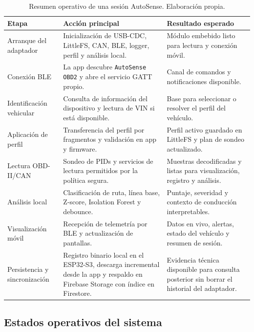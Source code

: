 \documentclass[12pt,letterpaper]{report}
\begin{document}
\begin{table}[htbp]
\centering
\small
\caption{Resumen operativo de una sesión AutoSense. Elaboración propia.}
\label{tab:autosense-general-operation}
\begin{tabular}{p{}p{}p{}}
\toprule
\textbf{Etapa} & \textbf{Acción principal} & \textbf{Resultado esperado} \\
\midrule
Arranque del adaptador & Inicialización de USB-CDC, LittleFS, CAN, BLE, logger, perfil y análisis local. & Módulo embebido listo para lectura y conexión móvil. \\
\addlinespace
Conexión BLE & La app descubre \texttt{AutoSense OBD2} y abre el servicio GATT propio. & Canal de comandos y notificaciones disponible. \\
\addlinespace
Identificación vehicular & Consulta de información del dispositivo y lectura de VIN si está disponible. & Base para seleccionar o resolver el perfil del vehículo. \\
\addlinespace
Aplicación de perfil & Transferencia del perfil por fragmentos y validación en app y firmware. & Perfil activo guardado en LittleFS y plan de sondeo actualizado. \\
\addlinespace
Lectura OBD-II/CAN & Sondeo de PIDs y servicios de lectura permitidos por la política segura. & Muestras decodificadas y listas para visualización, registro y análisis. \\
\addlinespace
Análisis local & Clasificación de ruta, línea base, Z-score, Isolation Forest y debounce. & Puntaje, severidad y contexto de conducción interpretables. \\
\addlinespace
Visualización móvil & Recepción de telemetría por BLE y actualización de pantallas. & Datos en vivo, alertas, estado del vehículo y resumen de sesión. \\
\addlinespace
Persistencia y sincronización & Registro binario local en el ESP32-S3, descarga incremental desde la app y respaldo en Firebase Storage con índice en Firestore. & Evidencia técnica disponible para consulta posterior sin borrar el historial del adaptador. \\
\bottomrule
\end{tabular}
\end{table}

\subsection{Estados operativos del sistema}
\end{document}
